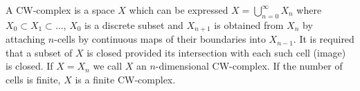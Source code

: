 A CW-complex is a space $X$ which can be expressed $X = \bigcup_{n=0}^{\infty} X_n$ where $X_0 \subset X_1 \subset \ldots$, $X_0$ is a discrete subset and $X_{n+1}$ is obtained from $X_n$ by attaching $n$-cells by continuous maps of their boundaries into $X_{n-1}$. It is required that a subset of $X$ is closed provided its intersection with each such cell (image) is closed. If $X = X_n$ we call $X$ an $n$-dimensional CW-complex. If the number of cells is finite, $X$ is a finite CW-complex.
